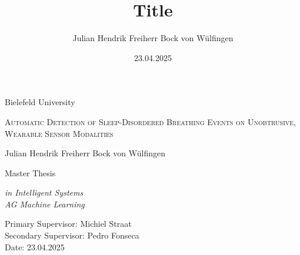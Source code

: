 \documentclass{report} %
\title{
    Title
}
\author{Julian Hendrik Freiherr Bock von Wülfingen}
\date{23.04.2025}
\begin{document}
\onehalfspacing


\begin{titlepage}

	\begin{center}

        \vspace*{\baselineskip}

        {\Large Bielefeld University}
        
        \vspace{1.75\baselineskip}

        {\LARGE \scshape Automatic Detection of Sleep-Disordered Breathing Events on Unobtrusive, Wearable Sensor Modalities\par} %

        \vspace{5\baselineskip}
        
        {\Large Julian Hendrik Freiherr Bock von Wülfingen}
        
        \vspace{2\baselineskip}

        {\Large Master Thesis\vspace{1em}}
        
        \textit{in Intelligent Systems \vspace{1em} \\ AG Machine Learning}
	
        \vfill

        \vspace{0.3\baselineskip}
        
        Primary Supervisor:     Michiel Straat\\
        Secondary Supervisor:   Pedro Fonseca\\
        Date:		            23.04.2025

    \end{center}

\end{titlepage}

\tableofcontents

\cleardoublepage
{}
















\appendix


\end{document}
